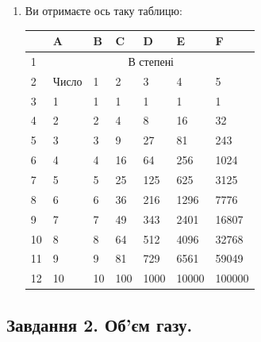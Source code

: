 \documentclass{article}
\begin{document}
\begin{enumerate}
		\item Ви отримаєте ось таку таблицю:
		\begin{center}
			\begin{tabular}{|p{} | p{0.1\textwidth}|p{}|p{}|p{}|p{}|p{}|}
				\hline
				& A & B & C & D & E & F \\ 
				\hline
				1 & \multicolumn{6}{|c|}{В степені} \\
				\hline
				2 & Число & 1 & 2 & 3 & 4 & 5 \\
				\hline
				3 & 1 & 1 & 1 & 1 & 1 & 1 \\
				\hline
				4 & 2 & 2 & 4 & 8 & 16 & 32 \\
				\hline
				5 & 3 & 3 & 9 & 27 & 81 & 243 \\
				\hline
				6 & 4 & 4 & 16 & 64 & 256 & 1024 \\
				\hline
				7 & 5 & 5 & 25 & 125 & 625 & 3125 \\
				\hline
				8 & 6 & 6 & 36 & 216 & 1296 & 7776 \\
				\hline
				9 & 7 & 7 & 49 & 343 & 2401 & 16807 \\
				\hline
				10 & 8 & 8 & 64 & 512 & 4096 & 32768 \\
				\hline
				11 & 9 & 9 & 81 & 729 & 6561 & 59049 \\
				\hline
				12 & 10 & 10 & 100 & 1000 & 10000 & 100000 \\
				\hline
			\end{tabular}
		\end{center}
	\end{enumerate}
	
	\begin{center}
		\subsection*{\textbf{Завдання 2. Об'єм газу. }}
	\end{center}
\end{document}
